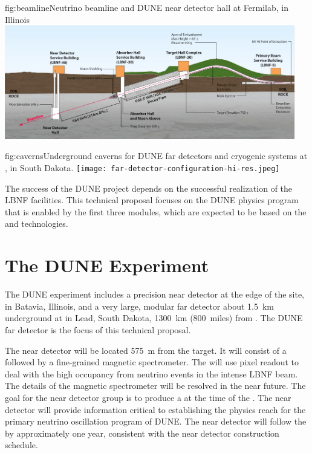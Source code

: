 \begin{dunefigure}{fig:beamline}{Neutrino beamline and DUNE near detector hall at Fermilab, in Illinois}
\includegraphics[width=0.95\textwidth]{figures/beamline-sideview.jpg}

\end{dunefigure}

\begin{dunefigure}{fig:caverns}{Underground caverns for DUNE far detectors and cryogenic systems at \surf{}, in South Dakota.}
\texttt{[image: far-detector-configuration-hi-res.jpeg]}
\end{dunefigure}

The success of the DUNE project depends on the successful realization of the LBNF facilities.
This technical proposal focuses on the DUNE physics program that is enabled by
the first three  modules, which are expected to be based on the \single and \dual \lar technologies. 

\section{The DUNE Experiment} %


The DUNE experiment includes a precision near detector at the edge of the \fnal site, in Batavia, Illinois, and a very large, modular far detector about \SI{1.5}{km} underground at \surf in Lead, South Dakota, \SI{1300}{km} (\SI{800}{miles}) from \fnal. The DUNE far detector is the focus of this technical proposal. 

The near detector will be located \SI{575}{m} from the target. It will consist of a \lartpc followed by a fine-grained magnetic spectrometer. The \lartpc will use pixel readout to deal with the high occupancy from neutrino events in the intense LBNF beam. The details of the magnetic spectrometer will be resolved in the near future. The goal for the near detector group is to produce a  at the time of the  . The near detector  will provide information critical to establishing the physics reach for the primary neutrino oscillation program of DUNE. The near detector  will follow the   by approximately one year, consistent with the near detector construction schedule.

